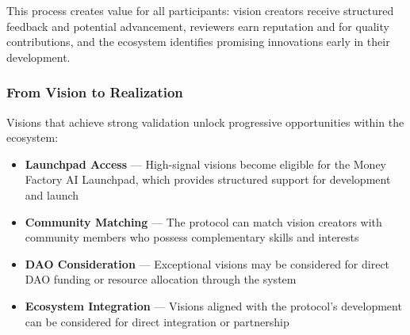 This process creates value for all participants: vision creators receive structured feedback and potential advancement, reviewers earn reputation and  for quality contributions, and the ecosystem identifies promising innovations early in their development.

\subsubsection*{From Vision to Realization}

Visions that achieve strong validation unlock progressive opportunities within the ecosystem:

\begin{itemize}
    \item \textbf{Launchpad Access} — High-signal visions become eligible for the Money Factory AI Launchpad, which provides structured support for development and launch
    
    \item \textbf{Community Matching} — The protocol can match vision creators with community members who possess complementary skills and interests
    
    \item \textbf{DAO Consideration} — Exceptional visions may be considered for direct DAO funding or resource allocation through the  system
    
    \item \textbf{Ecosystem Integration} — Visions aligned with the protocol's development can be considered for direct integration or partnership
\end{itemize}

